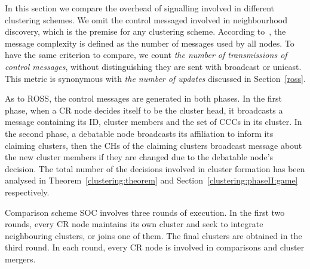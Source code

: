\documentclass[10pt,journal,compsoc]{IEEEtran}
\theoremstyle{mytheoremstyle}
\theoremstyle{mytheoremstyle}
\theoremstyle{mytheoremstyle}
\begin{document}
In this section we compare the overhead of signalling involved in different clustering schemes.
We omit the control messaged involved in neighbourhood discovery, which is the premise for any clustering scheme.
According to~\cite{complexity_aggregation_2011}, the message complexity is defined as the number of messages used by all nodes.
To have the same criterion to compare, we count \textit{the number of transmissions of control messages}, without distinguishing they are sent with broadcast or unicast.
This metric is synonymous with \textit{the number of updates} discussed in Section~\ref{ross}.

As to ROSS, the control messages are generated in both phases.
In the first phase, when a CR node decides itself to be the cluster head, it broadcasts a message containing its ID, cluster members and the set of CCCs in its cluster.
In the second phase, a debatable node broadcasts its affiliation to inform its claiming clusters, then the $\text{CH}$s of the claiming clusters  broadcast message about the new cluster members if they are changed due to the debatable node's decision.
The total number of the decisions involved in cluster formation has been analysed in Theorem~\ref{clustering:theorem} and Section~\ref{clustering:phaseII:game} respectively.

Comparison scheme SOC involves three rounds of execution. 
In the first two rounds, every CR node maintains its own cluster and seek to integrate neighbouring clusters, or joins one of them.
The final clusters are obtained in the third round. 
In each round, every CR node is involved in comparisons and cluster mergers.
\end{document}
